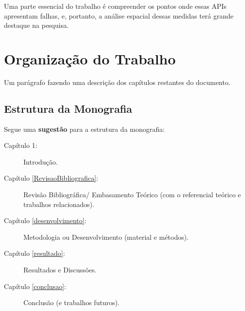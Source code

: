 Uma parte essencial do trabalho é compreender os pontos onde essas APIs apresentam falhas, e, portanto, a análise espacial dessas medidas terá grande destaque na pesquisa.

\section{Organização do Trabalho}

Um parágrafo fazendo uma descrição dos capítulos restantes do documento. 

\subsection{Estrutura da Monografia}

Segue uma \textbf{sugestão} para a estrutura da monografia: 

\begin{description}
   \item[Capítulo 1:] Introdução.
   \item[Capítulo \ref{RevisaoBibliografica}:] Revisão Bibliográfica/ Embasamento Teórico (com o referencial teórico e trabalhos relacionados).
   \item[Capítulo \ref{desenvolvimento}:] Metodologia ou Desenvolvimento (material e métodos).
   \item[Capítulo \ref{resultado}:] Resultados e Discussões.
   \item[Capítulo \ref{conclusao}:] Conclusão (e trabalhos futuros).
\end{description}


 









